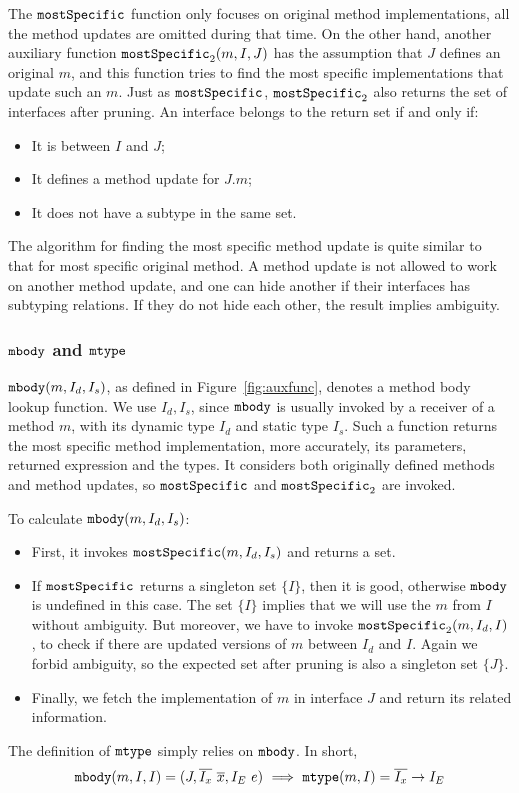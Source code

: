 The $\texttt{mostSpecific}$ function only focuses on original method implementations, all the method updates are omitted during that time. On the other hand, another auxiliary function $\texttt{mostSpecific}_2(m, I, J)$ has the assumption that $J$ defines an original $m$, and this function tries to find the most specific implementations that update such an $m$. Just as $\texttt{mostSpecific}$, $\texttt{mostSpecific}_2$ also returns the set of interfaces after pruning. An interface belongs to the return set if and only if:
\begin{itemize}
	\item It is between $I$ and $J$;
	\item It defines a method update for $J.m$;
	\item It does not have a subtype in the same set.
\end{itemize}
The algorithm for finding the most specific method update is quite similar to that for most specific original method. A method update is not allowed to work on another method update, and one can hide another if their interfaces has subtyping relations. If they do not hide each other, the result implies ambiguity.

\subsubsection{$\texttt{mbody}$ and $\texttt{mtype}$}

$\texttt{mbody}(m, I_d, I_s)$, as defined in Figure~\ref{fig:auxfunc}, denotes a method body lookup function.
We use $I_d, I_s$, since $\texttt{mbody}$ is usually invoked by a receiver of a method $m$, with its dynamic
type $I_d$ and static type $I_s$. Such a function returns the most specific method implementation, more
accurately, its parameters, returned expression and the types. It considers both originally defined methods and method updates, so $\texttt{mostSpecific}$ and $\texttt{mostSpecific}_2$ are invoked.

To calculate $\texttt{mbody}(m, I_d, I_s)$:
\begin{itemize}
	\item First, it invokes $\texttt{mostSpecific}(m, I_d, I_s)$ and returns a set.
	\item If $\texttt{mostSpecific}$ returns a singleton set $\{I\}$, then it is good, otherwise $\texttt{mbody}$ is undefined in
	this case. The set $\{I\}$ implies that we will use the $m$ from $I$ without ambiguity. But moreover, we have to invoke $\texttt{mostSpecific}_2(m, I_d, I)$, to check if there are updated versions of $m$ between $I_d$ and $I$. Again we forbid ambiguity, so the expected set after pruning is also a singleton set $\{J\}$.
	\item Finally, we fetch the implementation of $m$ in interface $J$ and return its related information.
\end{itemize}
The definition of $\texttt{mtype}$ simply relies on $\texttt{mbody}$. In short,
$$\mbody(m, I, I) = (J, \overline{I_x}\ \overline{x}, I_E\ e) \ \Longrightarrow\ \mtype(m, I) = \overline{I_x}\rightarrow I_E$$

